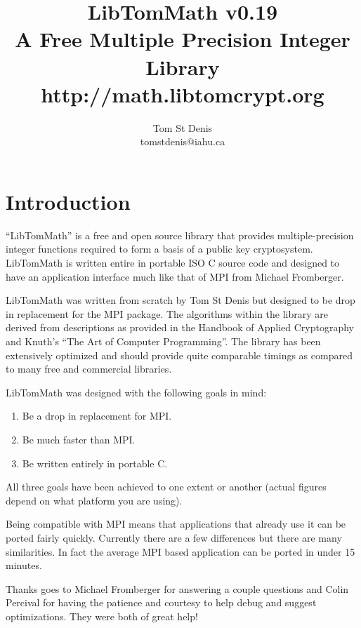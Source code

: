 \documentclass[]{article}
\begin{document}
\title{LibTomMath v0.19 \\ A Free Multiple Precision Integer Library \\ http://math.libtomcrypt.org }
\author{Tom St Denis \\ tomstdenis@iahu.ca}
\maketitle
\newpage

\section{Introduction}
``LibTomMath'' is a free and open source library that provides multiple-precision integer functions required to form a 
basis of a public key cryptosystem.  LibTomMath is written entire in portable ISO C source code and designed to have an 
application interface much like that of MPI from Michael Fromberger.  

LibTomMath was written from scratch by Tom St Denis but designed to be  drop in replacement for the MPI package.  The 
algorithms within the library are derived from descriptions as provided in the Handbook of Applied Cryptography and Knuth's
``The Art of Computer Programming''.  The library has been extensively optimized and should provide quite comparable 
timings as compared to many free and commercial libraries.

LibTomMath was designed with the following goals in mind:
\begin{enumerate}
\item Be a drop in replacement for MPI.
\item Be much faster than MPI.
\item Be written entirely in portable C.
\end{enumerate}

All three goals have been achieved to one extent or another (actual figures depend on what platform you are using).

Being compatible with MPI means that applications that already use it can be ported fairly quickly.  Currently there are 
a few differences but there are many similarities.  In fact the average MPI based application can be ported in under 15
minutes.  

Thanks goes to Michael Fromberger for answering a couple questions and Colin Percival for having the patience and courtesy to
help debug and suggest optimizations.  They were both of great help!
\end{document}
